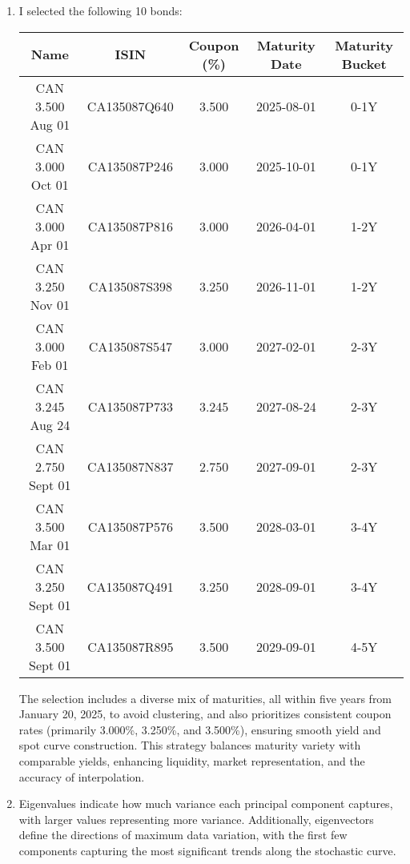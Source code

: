 \documentclass{article}
\begin{document}
\begin{enumerate}
    \item I selected the following 10 bonds:

    \begin{table}[h]
        \centering
        \begin{tabular}{c|c|c|c|c}
            \hline
            \textbf{Name} & \textbf{ISIN} & \textbf{Coupon (\%)} & \textbf{Maturity Date} & \textbf{Maturity Bucket} \\
            \hline
            CAN 3.500 Aug 01 & CA135087Q640 & 3.500 & 2025-08-01 & 0-1Y \\
            CAN 3.000 Oct 01 & CA135087P246 & 3.000 & 2025-10-01 & 0-1Y \\
            CAN 3.000 Apr 01 & CA135087P816 & 3.000 & 2026-04-01 & 1-2Y \\
            CAN 3.250 Nov 01 & CA135087S398 & 3.250 & 2026-11-01 & 1-2Y \\
            CAN 3.000 Feb 01 & CA135087S547 & 3.000 & 2027-02-01 & 2-3Y \\
            CAN 3.245 Aug 24 & CA135087P733 & 3.245 & 2027-08-24 & 2-3Y \\
            CAN 2.750 Sept 01 & CA135087N837 & 2.750 & 2027-09-01 & 2-3Y \\
            CAN 3.500 Mar 01 & CA135087P576 & 3.500 & 2028-03-01 & 3-4Y \\
            CAN 3.250 Sept 01 & CA135087Q491 & 3.250 & 2028-09-01 & 3-4Y \\
            CAN 3.500 Sept 01 & CA135087R895 & 3.500 & 2029-09-01 & 4-5Y \\
            \hline
        \end{tabular}
        \label{tab:bond_selection}
    \end{table}

    The selection includes a diverse mix of maturities, all within five years from January 20, 2025, to avoid clustering, and also prioritizes consistent coupon rates (primarily 3.000\%, 3.250\%, and 3.500\%), ensuring smooth yield and spot curve construction. This strategy balances maturity variety with comparable yields, enhancing liquidity, market representation, and the accuracy of interpolation.


    \item Eigenvalues indicate how much variance each principal component captures, with larger values representing more variance. Additionally, eigenvectors define the directions of maximum data variation, with the first few components capturing the most significant trends along the stochastic curve.
\end{enumerate}
\end{document}
